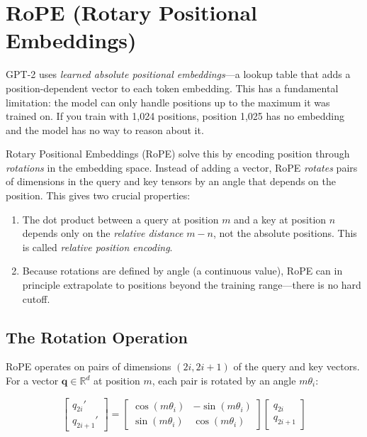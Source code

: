 \section{RoPE (Rotary Positional Embeddings)}

GPT-2 uses \emph{learned absolute positional embeddings}---a lookup table that
adds a position-dependent vector to each token embedding. This has a fundamental
limitation: the model can only handle positions up to the maximum it was trained
on. If you train with 1{,}024 positions, position 1{,}025 has no embedding and
the model has no way to reason about it.

Rotary Positional Embeddings (RoPE) solve this by encoding position through
\emph{rotations} in the embedding space. Instead of adding a vector, RoPE
\emph{rotates} pairs of dimensions in the query and key tensors by an angle
that depends on the position. This gives two crucial properties:
\begin{enumerate}
  \item The dot product between a query at position $m$ and a key at position
        $n$ depends only on the \emph{relative distance} $m - n$, not the
        absolute positions. This is called \emph{relative position encoding}.
  \item Because rotations are defined by angle (a continuous value), RoPE can
        in principle extrapolate to positions beyond the training range---there
        is no hard cutoff.
\end{enumerate}

\subsection{The Rotation Operation}

RoPE operates on pairs of dimensions $(2i, 2i+1)$ of the query and key
vectors. For a vector $\mathbf{q} \in \mathbb{R}^d$ at position $m$, each
pair is rotated by an angle $m\theta_i$:

\[
  \begin{bmatrix} q_{2i}' \\ q_{2i+1}' \end{bmatrix}
  =
  \begin{bmatrix} \cos(m\theta_i) & -\sin(m\theta_i) \\ \sin(m\theta_i) & \cos(m\theta_i) \end{bmatrix}
  \begin{bmatrix} q_{2i} \\ q_{2i+1} \end{bmatrix}
\]


